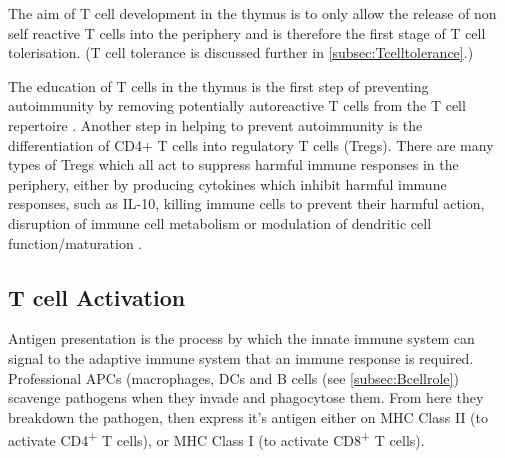 The aim of T cell development in the thymus is to only allow the release of non self reactive T cells into the periphery and is therefore the first stage of T cell tolerisation. 
(T cell tolerance is discussed further in \cref{subsec:Tcelltolerance}.)

The education of T cells in the thymus is the first step of preventing autoimmunity by removing potentially autoreactive T cells from the T cell repertoire \citep{Walker2002}.
Another step in helping to prevent autoimmunity is the differentiation of CD4+ T cells into regulatory T cells (Tregs).
There are many types of Tregs which all act to suppress harmful immune responses in the periphery, either by producing cytokines which inhibit harmful immune responses, such as IL-10, killing immune cells to prevent their harmful action, disruption of immune cell metabolism or modulation of dendritic cell function/maturation \citep{Vignali2008}. 


\subsection{T cell Activation}
\label{subsec:Tcellactivation}


Antigen presentation is the process by which the innate immune system can signal to the adaptive immune system that an immune response is required.
Professional APCs (macrophages, DCs and B cells (see \cref{subsec:Bcellrole}) scavenge pathogens when they invade and phagocytose them.
From here they breakdown the pathogen, then express it's antigen either on MHC Class II (to activate CD4\textsuperscript{+} T cells), or MHC Class I (to activate CD8\textsuperscript{+} T cells).


